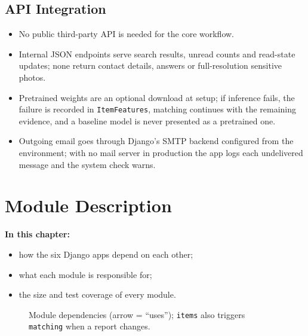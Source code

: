 \documentclass[12pt,a4paper,oneside]{report}
\newcommand{\code}[1]{\texttt{#1}}
\begin{document}
\section{API Integration}
\begin{itemize}
  \item No public third-party API is needed for the core workflow.
  \item Internal JSON endpoints serve search results, unread counts and read-state updates; none return contact details, answers or full-resolution sensitive photos.
  \item Pretrained weights are an optional download at setup; if inference fails, the failure is recorded in \code{ItemFeatures}, matching continues with the remaining evidence, and a baseline model is never presented as a pretrained one.
  \item Outgoing email goes through Django's SMTP backend configured from the environment; with no mail server in production the app logs each undelivered message and the system check warns.
\end{itemize}

\chapter{Module Description}
\textbf{In this chapter:}
\begin{itemize}[beginpenalty=10000]
  \item how the six Django apps depend on each other;
  \item what each module is responsible for;
  \item the size and test coverage of every module.
\end{itemize}

\begin{figure}[!htbp]
\centering
{}
\caption[Module dependencies]{Module dependencies (arrow = ``uses''); \code{items} also triggers \code{matching} when a report changes.}
\end{figure}
\end{document}
